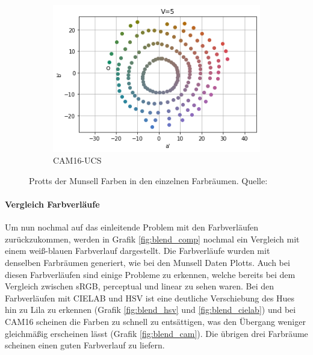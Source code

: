 \documentclass[12pt, a4paper, ngerman]{article}
\begin{document}
\begin{figure}
\begin{subfigure}[b]{0.3\linewidth}
    \includegraphics[width=\linewidth]{Grafiken/Vergleich_Munsell/cam16_munsell.png}
    \caption{CAM16-UCS}
    \label{fig:munsell_cam}
  \end{subfigure}
  
  \caption{Protts der Munsell Farben in den einzelnen Farbräumen. Quelle:~\cite{Oklab_2020}}
  \label{fig:munsell_plots}
\end{figure}

\paragraph{Vergleich Farbverläufe}
Um nun nochmal auf das einleitende Problem mit den Farbverläufen zurückzukommen, 
werden in Grafik \ref{fig:blend_comp} nochmal ein Vergleich mit einem weiß-blauen Farbverlauf dargestellt.
Die Farbverläufe wurden mit denselben Farbräumen generiert, wie bei den Munsell Daten Plotts.
Auch bei diesen Farbverläufen sind einige Probleme zu erkennen, 
welche bereits bei dem Vergleich zwischen sRGB, perceptual und linear zu sehen waren.
Bei den Farbverläufen mit CIELAB und HSV ist eine deutliche Verschiebung des Hues hin zu Lila zu erkennen (Grafik \ref{fig:blend_hsv} und \ref{fig:blend_cielab}) und 
bei CAM16 scheinen die Farben zu schnell zu entsättigen, was den Übergang weniger gleichmäßig erscheinen lässt (Grafik \ref{fig:blend_cam}). 
Die übrigen drei Farbräume scheinen einen guten Farbverlauf zu liefern. 
\end{document}
